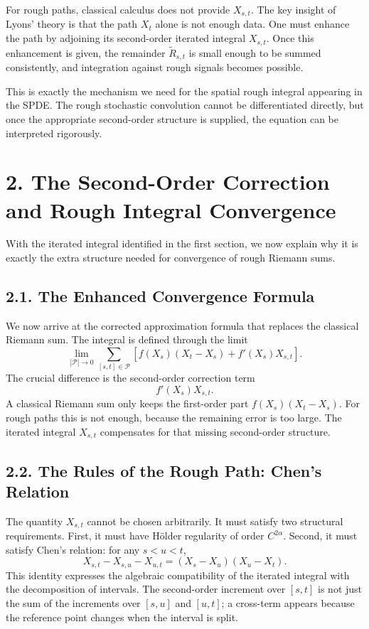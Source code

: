 \documentclass[11pt]{article}
\theoremstyle{definition}
\theoremstyle{remark}
\begin{document}
For rough paths, classical calculus does not provide \(X_{s,t}\). The key insight of Lyons' theory is that the path \(X_t\) alone is not enough data. One must enhance the path by adjoining its second-order iterated integral \(X_{s,t}\). Once this enhancement is given, the remainder \(\widetilde R_{s,t}\) is small enough to be summed consistently, and integration against rough signals becomes possible.

This is exactly the mechanism we need for the spatial rough integral appearing in the SPDE. The rough stochastic convolution cannot be differentiated directly, but once the appropriate second-order structure is supplied, the equation can be interpreted rigorously.

\section*{2. The Second-Order Correction and Rough Integral Convergence}
With the iterated integral identified in the first section, we now explain why it is exactly the extra structure needed for convergence of rough Riemann sums.

\subsection*{2.1. The Enhanced Convergence Formula}
We now arrive at the corrected approximation formula that replaces the classical Riemann sum. The integral is defined through the limit
\[
\lim_{|\mathcal P|\to 0}
\sum_{[s,t]\in\mathcal P}
\left[
f(X_s)(X_t-X_s)+f'(X_s)X_{s,t}
\right].
\]
The crucial difference is the second-order correction term
\[
f'(X_s)X_{s,t}.
\]
A classical Riemann sum only keeps the first-order part \(f(X_s)(X_t-X_s)\). For rough paths this is not enough, because the remaining error is too large. The iterated integral \(X_{s,t}\) compensates for that missing second-order structure.

\subsection*{2.2. The Rules of the Rough Path: Chen's Relation}
The quantity \(X_{s,t}\) cannot be chosen arbitrarily. It must satisfy two structural requirements. First, it must have Hölder regularity of order \(C^{2\alpha}\). Second, it must satisfy Chen's relation: for any \(s<u<t\),
\[
X_{s,t}-X_{s,u}-X_{u,t}
=
(X_s-X_u)(X_u-X_t).
\]
This identity expresses the algebraic compatibility of the iterated integral with the decomposition of intervals. The second-order increment over \([s,t]\) is not just the sum of the increments over \([s,u]\) and \([u,t]\); a cross-term appears because the reference point changes when the interval is split.
\end{document}
